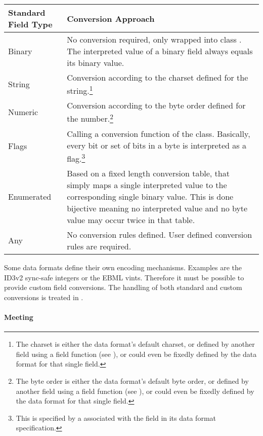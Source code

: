 \begin{longtable}{|p{}|p{}|}
	\hline
	Standard Field Type & Conversion Approach\\
	\endhead
	\hline
	Binary & No conversion required, only wrapped into class \CLASSbinaryValue{}. The interpreted value of a binary field always equals its binary value.\\
	\hline
	String & Conversion according to the charset defined for the string.\footnote{The charset is either the data format's default charset, or defined by another field using a field function (see \SectionLink{sec:FieldFunctions}), or could even be fixedly defined by the data format for that single field.}\\
	\hline
	Numeric & Conversion according to the byte order defined for the number.\footnote{The byte order is either the data format's default byte order, or defined by another field using a field function (see \SectionLink{sec:FieldFunctions}), or could even be fixedly defined by the data format for that single field.}\\
	\hline
	Flags & Calling a conversion function of the \CLASSFlags{} class. Basically, every bit or set of bits in a byte is interpreted as a flag.\footnote{This is specified by a \CLASSflagSpecification{} associated with the field in its data format specification.}\\
	\hline
	Enumerated & Based on a fixed length conversion table, that simply maps a single interpreted value to the corresponding single binary value. This is done bijective meaning no interpreted value and no byte value may occur twice in that table.\\
	\hline
	Any & No conversion rules defined. User defined conversion rules are required.\\
	\hline
\end{longtable}

Some data formats define their own encoding mechanisms. Examples are the ID3v2 sync-safe integers or the EBML vints. Therefore it must be possible to provide custom field conversions. The handling of both standard and custom conversions is treated in .


\paragraph{Meeting \REQUfieldQueryFields{}}
\label{sec:MeetingREQUfieldQueryFields}

